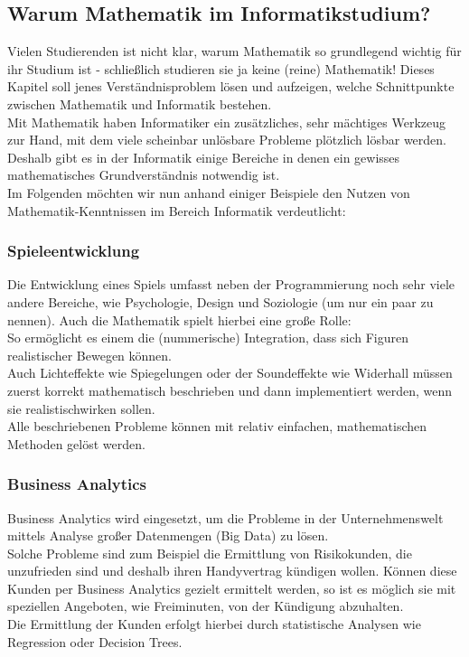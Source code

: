 \subsection{Warum Mathematik im Informatikstudium?}
Vielen Studierenden ist nicht klar, warum Mathematik so grundlegend wichtig für ihr Studium ist - schließlich studieren sie ja keine (reine) Mathematik! Dieses Kapitel soll jenes Verständnisproblem lösen und aufzeigen, welche Schnittpunkte zwischen Mathematik und Informatik bestehen.\\
Mit Mathematik haben Informatiker ein zusätzliches, sehr mächtiges Werkzeug zur Hand, mit dem viele scheinbar unlösbare Probleme plötzlich lösbar werden.
Deshalb gibt es in der Informatik einige Bereiche in denen ein gewisses mathematisches Grundverständnis notwendig ist.\\
Im Folgenden möchten wir nun anhand einiger Beispiele den Nutzen von Mathematik-Kenntnissen im Bereich Informatik verdeutlicht:

\subsubsection{Spieleentwicklung}
Die Entwicklung eines Spiels umfasst neben der Programmierung noch sehr viele andere Bereiche, wie Psychologie, Design und Soziologie (um nur ein paar zu nennen). Auch die Mathematik spielt hierbei eine große Rolle:\\
So ermöglicht es einem die (nummerische) Integration, dass sich Figuren realistischer Bewegen können.\\
Auch Lichteffekte wie Spiegelungen oder der Soundeffekte wie Widerhall müssen zuerst korrekt mathematisch beschrieben und dann implementiert werden, wenn sie \glqq realistisch\grqq wirken sollen.\\
Alle beschriebenen Probleme können mit relativ einfachen, mathematischen Methoden gelöst werden.

\subsubsection{Business Analytics}
Business Analytics wird eingesetzt, um die Probleme in der Unternehmenswelt mittels Analyse großer Datenmengen (Big Data) zu lösen.\\
Solche Probleme sind zum Beispiel die Ermittlung von \glqq Risikokunden\grqq, die unzufrieden sind und deshalb ihren Handyvertrag kündigen wollen. 
Können diese Kunden per Business Analytics gezielt ermittelt werden, so ist es möglich sie mit speziellen Angeboten, wie Freiminuten, von der Kündigung abzuhalten.\\
Die Ermittlung der Kunden erfolgt hierbei durch statistische Analysen wie Regression oder Decision Trees.

